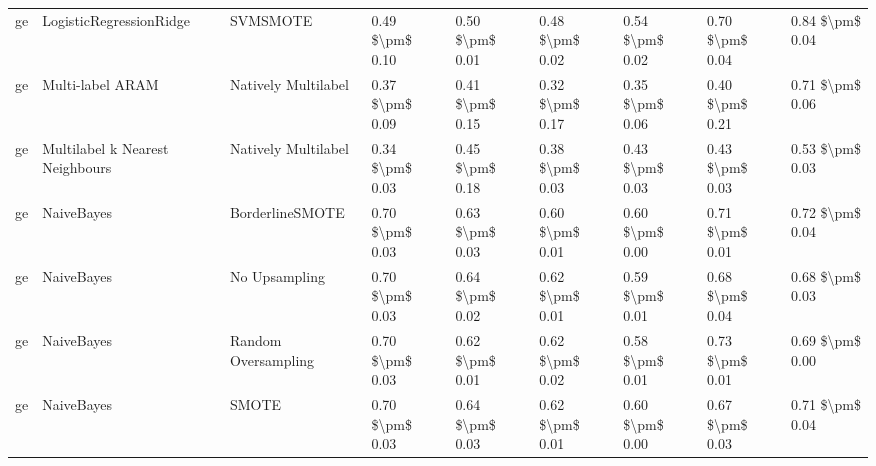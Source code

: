 \begin{tabular}{lllllllll}
      ge &         LogisticRegressionRidge &                      SVMSMOTE &     0.49 \$\textbackslash pm\$ 0.10 &           0.50 \$\textbackslash pm\$ 0.01 &       0.48 \$\textbackslash pm\$ 0.02 &        0.54 \$\textbackslash pm\$ 0.02 &                         0.70 \$\textbackslash pm\$ 0.04 &     0.84 \$\textbackslash pm\$ 0.04 \\
      ge &                Multi-label ARAM &           Natively Multilabel &     0.37 \$\textbackslash pm\$ 0.09 &           0.41 \$\textbackslash pm\$ 0.15 &       0.32 \$\textbackslash pm\$ 0.17 &        0.35 \$\textbackslash pm\$ 0.06 &                         0.40 \$\textbackslash pm\$ 0.21 &     0.71 \$\textbackslash pm\$ 0.06 \\
      ge & Multilabel k Nearest Neighbours &           Natively Multilabel &     0.34 \$\textbackslash pm\$ 0.03 &           0.45 \$\textbackslash pm\$ 0.18 &       0.38 \$\textbackslash pm\$ 0.03 &        0.43 \$\textbackslash pm\$ 0.03 &                         0.43 \$\textbackslash pm\$ 0.03 &     0.53 \$\textbackslash pm\$ 0.03 \\
      ge &                      NaiveBayes &               BorderlineSMOTE &     0.70 \$\textbackslash pm\$ 0.03 &           0.63 \$\textbackslash pm\$ 0.03 &       0.60 \$\textbackslash pm\$ 0.01 &        0.60 \$\textbackslash pm\$ 0.00 &                         0.71 \$\textbackslash pm\$ 0.01 &     0.72 \$\textbackslash pm\$ 0.04 \\
      ge &                      NaiveBayes &                 No Upsampling &     0.70 \$\textbackslash pm\$ 0.03 &           0.64 \$\textbackslash pm\$ 0.02 &       0.62 \$\textbackslash pm\$ 0.01 &        0.59 \$\textbackslash pm\$ 0.01 &                         0.68 \$\textbackslash pm\$ 0.04 &     0.68 \$\textbackslash pm\$ 0.03 \\
      ge &                      NaiveBayes &           Random Oversampling &     0.70 \$\textbackslash pm\$ 0.03 &           0.62 \$\textbackslash pm\$ 0.01 &       0.62 \$\textbackslash pm\$ 0.02 &        0.58 \$\textbackslash pm\$ 0.01 &                         0.73 \$\textbackslash pm\$ 0.01 &     0.69 \$\textbackslash pm\$ 0.00 \\
      ge &                      NaiveBayes &                         SMOTE &     0.70 \$\textbackslash pm\$ 0.03 &           0.64 \$\textbackslash pm\$ 0.03 &       0.62 \$\textbackslash pm\$ 0.01 &        0.60 \$\textbackslash pm\$ 0.00 &                         0.67 \$\textbackslash pm\$ 0.03 &     0.71 \$\textbackslash pm\$ 0.04 \\

\end{tabular}
